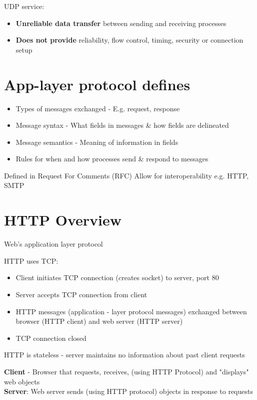 \documentclass{article}[18pt]
\begin{document}
UDP service:
\begin{itemize}
	\item \textbf{Unreliable data transfer} between sending and receiving processes
	\item \textbf{Does not provide} reliability, flow control, timing, security or connection setup
\end{itemize}

\section{App-layer protocol defines}
\begin{itemize}
	\item Types of messages exchanged - E.g. request, response
	\item Message syntax - What fields in messages \& how fields are delineated
	\item Message semantics - Meaning of information in fields
	\item Rules for when and how processes send \& respond to messages
\end{itemize}
\begin{defin}
Defined in Request For Comments (RFC) Allow for interoperability e.g. HTTP, SMTP 
\end{defin}
\section{HTTP Overview}
\begin{defin}
Web's application layer protocol
\end{defin}
HTTP uses TCP:
\begin{itemize}
	\item Client initiates TCP connection (creates socket) to server, port 80
	\item Server accepts TCP connection from client
	\item HTTP messages (application - layer protocol messages) exchanged between browser (HTTP client) and web server (HTTP server)
	\item TCP connection closed
\end{itemize}
\begin{important}[HTTP]
HTTP is stateless - server maintains no information about past client requests
\end{important}
\begin{defin}
\textbf{Client} - Browser that requests, receives, (using HTTP Protocol) and "displays" web objects\\
\textbf{Server}: Web server sends (using HTTP protocol) objects in response to requests 
\end{defin}
\end{document}
